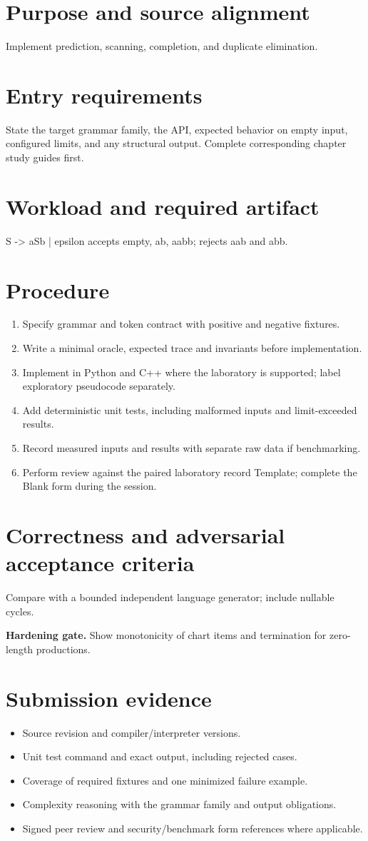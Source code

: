 \documentclass[11pt,letterpaper]{article}
\begin{document}
\makedoctitle\makedocsummary
\tableofcontents\clearpage
\section{Purpose and source alignment}
Implement prediction, scanning, completion, and duplicate elimination.
\section{Entry requirements}
State the target grammar family, the API, expected behavior on empty input, configured limits, and any structural output. Complete corresponding chapter study guides first.
\section{Workload and required artifact}
S -> aSb | epsilon accepts empty, ab, aabb; rejects aab and abb.
\section{Procedure}
\begin{enumerate}\item Specify grammar and token contract with positive and negative fixtures.\item Write a minimal oracle, expected trace and invariants before implementation.\item Implement in Python and C++ where the laboratory is supported; label exploratory pseudocode separately.\item Add deterministic unit tests, including malformed inputs and limit-exceeded results.\item Record measured inputs and results with separate raw data if benchmarking.\item Perform review against the paired laboratory record Template; complete the Blank form during the session.\end{enumerate}
\section{Correctness and adversarial acceptance criteria}
Compare with a bounded independent language generator; include nullable cycles.\par\textbf{Hardening gate.} Show monotonicity of chart items and termination for zero-length productions.
\section{Submission evidence}
\begin{itemize}\item Source revision and compiler/interpreter versions.\item Unit test command and exact output, including rejected cases.\item Coverage of required fixtures and one minimized failure example.\item Complexity reasoning with the grammar family and output obligations.\item Signed peer review and security/benchmark form references where applicable.\end{itemize}
\end{document}
